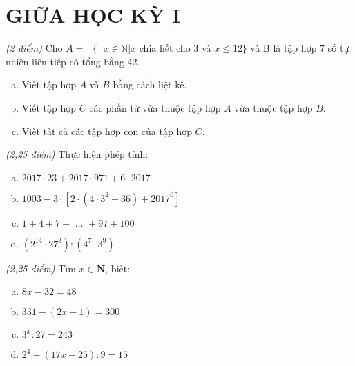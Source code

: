 \section{GIỮA HỌC KỲ I}
\setcounter{ex}{0}
\begin{ex} \textit{(2 điểm)} Cho $A=\text{ }\!\!\{\!\!\text{ }x\in \mathbb{N}|x$ chia hết cho 3 và $x\le 12\}$ và B là tập hợp 7 số tự nhiên liên tiếp có tổng bằng 42.
\begin{enumerate} [a)]
\item Viết tập hợp $A$ và $B$ bằng cách liệt kê.
\item Viết tập hợp $C$ các phần tử vừa thuộc tập hợp $A$ vừa thuộc tập hợp $B$.
\item Viết tất cả các tập hợp con của tập hợp $C$.

\end{enumerate}
\end{ex}    \begin{ex}  \textit{(2,25 điểm)} Thực hiện phép tính:
\begin{enumerate} [a)]
\item $2017\cdot 23+2017\cdot 971+6\cdot 2017$ 
\item $1003-3\cdot \left[ 2\cdot \left( 4\cdot {{3}^{2}}-36 \right)+{{2017}^{0}} \right]$ 
\item $1+4+7+\,\,\ldots \,\,+97+100$ 
\item $\left( {{2}^{14}}\cdot {{27}^{3}} \right):\left( {{4}^{7}}\cdot {{3}^{9}} \right)$  

\end{enumerate}
\end{ex}    \begin{ex}  \textit{(2,25 điểm)} Tìm $x \in  \mathbf{N}$, biết:
 \begin{enumerate}[a)]
\item $8x-32=48$ 
\item $331-\left( 2x+1 \right)=300$ 
\item ${{3}^{x}}:27=243$ 
\item ${{2}^{4}}-\left( 17x-25 \right):9=15$ 


\end{enumerate}
\end{ex}

